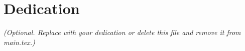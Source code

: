 \chapter*{Dedication}

\textit{(Optional. Replace with your dedication or delete this file and remove it from main.tex.)}
